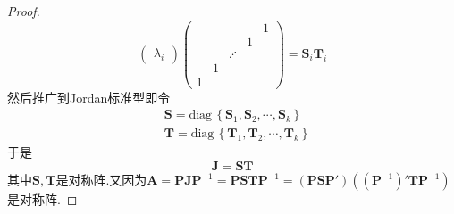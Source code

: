 {\begin{proof}
\[\begin{pmatrix}
                \lambda_i
            \end{pmatrix}\begin{pmatrix}
                 &   &         &   & 1 \\
                 &   &         & 1     \\
                 &   & \iddots         \\
                 & 1                   \\
                1
            \end{pmatrix}=\bm{S}_i\bm{T}_i
        \]然后推广到Jordan标准型即令\begin{align*}
             & \bm{S}=\mathrm{diag}\,\left\{
            \bm{S}_1,\bm{S}_2,\cdots,\bm{S}_k
            \right\}                         \\
             & \bm{T}=\mathrm{diag}\,\left\{
            \bm{T}_1,\bm{T}_2,\cdots,\bm{T}_k
            \right\}
        \end{align*}于是\[
            \bm{J}=\bm{ST}
        \]其中$\bm{S},\bm{T}$是对称阵.又因为$\bm{A}=\bm{PJP}^{-1}=\bm{PSTP}^{-1}=\left(\bm{PSP}'\right)\left(\left(\bm{P}^{-1}\right)'\bm{TP}^{-1}\right)$是对称阵.
    \end{proof}
}
